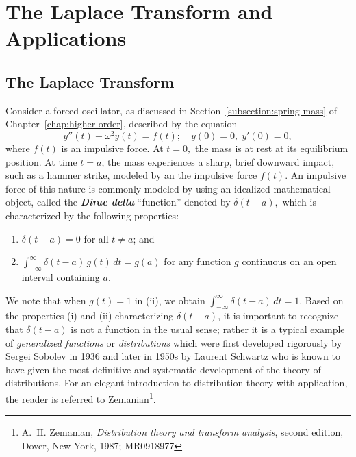 
\setcounter{chapter}{4}
\chapter{The Laplace Transform and Applications}\label{ch:Laplace Transform}
	


\minitoc %

\section{The Laplace Transform}\label{chap7:section1}



Consider a forced oscillator, as discussed in Section~\ref{subsection:spring-mass} of Chapter~\ref{chap:higher-order}, described by the equation  
\begin{equation}\label{chap7:01}
	y''(t) + \omega^2 y(t) = f(t); \quad  y(0) = 0,\; y'(0)= 0,
\end{equation}  
where \( f(t) \) is an impulsive  force. At \(t =0,\) the mass is at rest at its equilibrium position. At time \( t = a \), the mass experiences a sharp, brief downward impact, such as a hammer strike, modeled by an the impulsive force \( f(t) .\) 
An impulsive force of this nature is commonly modeled by using an idealized mathematical object, called the   \textbf{\textit{Dirac delta}} ``function'' denoted by $\delta (t-a),$ which is characterized by the following  properties:

\begin{enumerate}[label= (\roman*)]
	\item \( \delta(t - a) = 0 \) for all \( t \ne a \); and
	\item \(\int_{-\infty}^\infty \delta(t - a)\, g(t)\, dt = g(a) \) for any function \( g \) continuous on an open interval containing \( a \).
\end{enumerate}
We note  that when $g(t) =1$ in (ii), we obtain 
\( \int_{-\infty}^\infty \delta(t - a)\, dt = 1 \).
Based on the  properties (i) and (ii) characterizing \( \delta(t - a) \), it is important to recognize that \( \delta(t - a) \) is not a  function in the usual sense; rather it is a typical example of \textit{generalized functions} or \textit{distributions} which were first developed rigorously  by Sergei Sobolev in 1936 and later in 1950s by Laurent Schwartz who is known to have given the most definitive and systematic development of the theory of distributions. For an elegant introduction to  distribution theory with application, the reader is referred to  Zemanian\footnote[1]{A.~H. Zemanian, {\it Distribution theory and transform analysis}, second edition, Dover, New York, 1987; MR0918977}.

